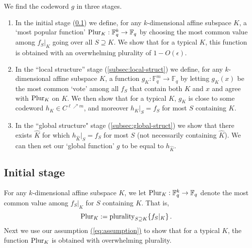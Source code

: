 \documentclass[11pt]{article}
\numberwithin{equation}{section}
\theoremstyle{definition}
\theoremstyle{plain}
\renewcommand{\eqref}[1]{\hyperref[#1]{(\ref*{#1})}}
\theoremstyle{plain}
\newcommand{\F}{{\mathbb{F}}}
\newcommand{\plurality}{{\rm{plurality}}}
\newcommand{\pl}{{\rm{Plur}}}
\begin{document}
We find the codeword $g$ in three stages.
\begin{enumerate}
  \item In the initial stage (\cref{subsec:init}) we define, for any $k$-dimensional affine subspace $K$, a `most popular function' %
$\pl_K: \F_q^k \to \F_q$ by choosing the most common value among $f_S|_K$ going over all $S\supseteq K$. We show that for a typical $K$, this function is obtained with an overwhelming plurality of $1-O(\epsilon)$.
  \item In the ``local structure'' stage (\cref{subsec:local-struct}) we define, for any $k$-dimensional affine subspace $K$, a function $g_K: \F_q^m \to \F_q$ by letting $g_K(x)$ be the most common `vote' %
among all $f_S$ that contain both $K$ and $x$ and agree with $\pl_K$ on $K$. We then show that for a typical $K$, $g_K$ is close to some codeword $h_K \in C^{\ell \nearrow m}$, and moreover $h_K|_S = f_S$ for most $S$ containing $K$.
\item In the ``global structure" stage (\cref{subsec:global-struct}) we show that there exists $\hat K$ for which $h_{\hat K}|_S = f_S$  for most $S$ (not necessarily containing $\hat K$). We can then set our
`global function' %
$g$ to be equal to $h_{\hat K}$.
\end{enumerate}

\subsection{Initial stage}\label{subsec:init}

For any $k$-dimensional affine subspace $K$, we let $\pl_K: \F_q^k \to \F_q$ denote the most common value among $f_S|_K$ for $S$ containing $K$. That is,
\[\pl_K := \plurality_{S\supseteq K}\{f_S|_K \}\,.\]
Next we use our assumption \eqref{eq:assumption} to show that for a typical $K$, the function $\pl_K$ is obtained with overwhelming plurality.
\end{document}
